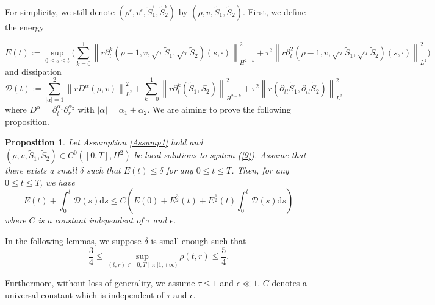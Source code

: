 \documentclass[10pt,reqno]{amsart}
\numberwithin{equation}{section}
\newtheorem{proposition}[theorem]{Proposition}
\begin{document}
	For simplicity, we still denote $(\rho^{\epsilon}, v^{\epsilon}, \tilde{S}_1^{\epsilon},\tilde{S}_2^{\epsilon})$ by $(\rho, v,\tilde{S}_1,\tilde{S}_2)$. 
	First, we define the energy 
	
	\begin{equation}
		E(t):=\sup _{0 \leq s \leq t}\bigg( \sum_{k=0}^1\left\|r\partial_{t}^k(\rho-1, v, \sqrt{\tau  } \tilde{S}_1, \sqrt{\tau } \tilde{S}_2)(s,\cdot)\right\|_{H^{2-k}}^2
		+\tau^2\left\|r\partial_{t}^2(\rho-1, v, \sqrt{\tau  } \tilde{S}_1, \sqrt{\tau } \tilde{S}_2)(s,\cdot)\right\|_{L^{2}}^2\bigg)
	\end{equation}
	and  dissipation
	\begin{equation}
		\mathcal{D}(t):=\sum_{|\alpha|=1}^2\left\|r D^\alpha(\rho, v)\right\|_{L^2}^2
		+\sum_{k=0}^1\left\|r\partial_{t}^k(\tilde{S}_1, \tilde{S}_2)\right\|_{H^{2-k}}^2
		+\tau^2\left\|r(\partial_{tt}\tilde{S}_1,\partial_{tt}\tilde{S}_2)\right\|_{L^{2}}^2
	\end{equation}
	where $D^\alpha=\partial_{t}^{\alpha_1}\partial_{r}^{\alpha_2}$ with $|\alpha|=\alpha_1+\alpha_2$. We are aiming to prove the following proposition.
	\begin{proposition}\label{prop1}
		Let Assumption \ref{Assump1} hold and $(\rho, v, \tilde{S}_1, \tilde{S}_2)\in C^0([0,T],H^2)$ be local solutions to system (\ref{9}). Assume that there exists a small $\delta$ such that $E(t)\leq \delta$ for any $0\le t \le T$. Then, for any $0\le t \le T$, we have
		\begin{equation}
			E(t)+\int_0^t \mathcal{D}(s) \mathrm{d}s\leq C \left(E(0)+E^{\frac{3}{2}}(t)+E^{\frac{1}{2}}(t) \int_0^t \mathcal{D}(s) \mathrm{d}s\right)
		\end{equation}
		where $C$ is a constant independent of $\tau$ and $\epsilon$.
	\end{proposition}
	
	In the following lemmas, we suppose \(\delta\) is small enough such that
	\begin{equation}\label{hu3.4}
		\frac{3}{4} \leq \sup_{(t,r)\in[0,T]\times[1,+\infty)} \rho(t,r) \leq \frac{5}{4}.
	\end{equation}
	
	Furthermore, without loss of generality, we assume $\tau \leq 1$ and $\epsilon \ll 1$. $C$ denotes a universal constant which is independent of \(\tau\) and \(\epsilon\).
	
\end{document}
